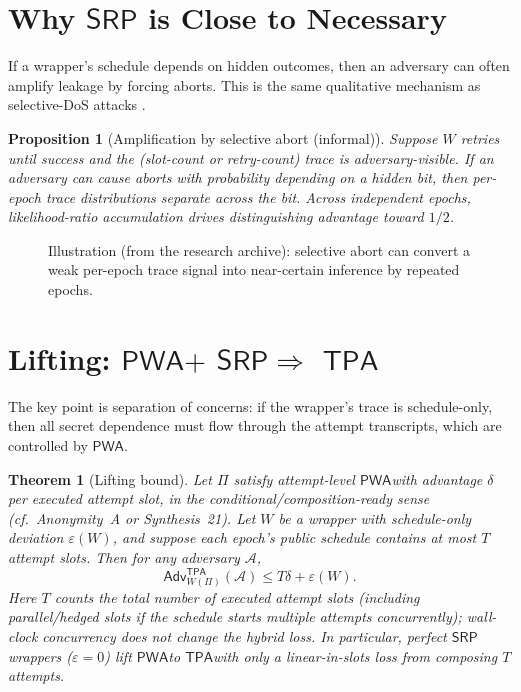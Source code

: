 \documentclass[11pt]{article}
\newtheorem{theorem}{Theorem}
\newtheorem{proposition}{Proposition}
\newcommand{\Adv}{\ensuremath{\mathsf{Adv}}}
\newcommand{\PWA}{\ensuremath{\mathsf{PWA}}}
\newcommand{\TPA}{\ensuremath{\mathsf{TPA}}}
\newcommand{\SRP}{\ensuremath{\mathsf{SRP}}}
\begin{document}
\section{Why \texorpdfstring{\SRP}{SRP} is Close to Necessary}
If a wrapper's schedule depends on hidden outcomes, then an adversary can often amplify leakage by forcing aborts.
This is the same qualitative mechanism as selective-DoS attacks \cite{borisovDanezisMittalCCS2007,dasborisovSelectiveDoS2013}.

\begin{proposition}[Amplification by selective abort (informal)]
Suppose $W$ retries until success and the (slot-count or retry-count) trace is adversary-visible.
If an adversary can cause aborts with probability depending on a hidden bit, then per-epoch trace distributions separate across the bit.
Across independent epochs, likelihood-ratio accumulation drives distinguishing advantage toward $1/2$.
\end{proposition}

\begin{figure}[t]
  \centering
  \caption{Illustration (from the research archive): selective abort can convert a weak per-epoch trace signal into near-certain inference by repeated epochs.}
  \label{fig:abortamp}
\end{figure}

\section{Lifting: \texorpdfstring{\PWA $+$ \SRP $\Rightarrow$ \TPA}{PWA + SRP => TPA}}
The key point is separation of concerns: if the wrapper's trace is schedule-only, then all secret dependence must flow through the attempt transcripts, which are controlled by \PWA.

\begin{theorem}[Lifting bound]
Let $\Pi$ satisfy attempt-level \PWA with advantage $\delta$ \emph{per executed attempt slot}, in the conditional/composition-ready sense (cf.\ Anonymity~A or Synthesis~21).\cite{series:oddsinflation,series:condcert}
Let $W$ be a wrapper with schedule-only deviation $\varepsilon(W)$, and suppose each epoch's public schedule contains at most $T$ attempt slots.
Then for any adversary $\mathcal{A}$,
\[\Adv^{\TPA}_{W(\Pi)}(\mathcal{A}) \le T\delta + \varepsilon(W).\]
Here $T$ counts the total number of executed attempt slots (including parallel/hedged slots if the schedule starts multiple attempts concurrently); wall-clock concurrency does not change the hybrid loss.
In particular, perfect \SRP wrappers ($\varepsilon=0$) lift \PWA to \TPA with only a linear-in-slots loss from composing $T$ attempts.
\end{theorem}
\end{document}
